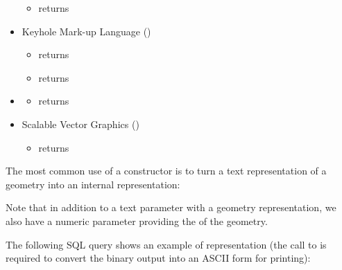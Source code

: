 \documentclass[a4paper,11pt,english]{sphinxmanual}
\begin{document}
\begin{itemize}
\begin{itemize}
\item {} 
 returns 

\end{itemize}

\item {} 
Keyhole Mark-up Language ({\hyperref[\detokenize{glossary:term-kml}]{}})
\begin{itemize}
\item {} 
 returns 

\item {} 
 returns 

\end{itemize}

\item {} 
{\hyperref[\detokenize{glossary:term-geojson}]{}}
\begin{itemize}
\item {} 
 returns 

\end{itemize}

\item {} 
Scalable Vector Graphics ({\hyperref[\detokenize{glossary:term-svg}]{}})
\begin{itemize}
\item {} 
 returns 

\end{itemize}

\end{itemize}

The most common use of a constructor is to turn a text representation of a geometry into an internal representation:

Note that in addition to a text parameter with a geometry representation, we also have a numeric parameter providing the {\hyperref[\detokenize{glossary:term-srid}]{}} of the geometry.

The following SQL query shows an example of {\hyperref[\detokenize{glossary:term-wkb}]{}} representation (the call to  is required to convert the binary output into an ASCII form for printing):
\end{document}
